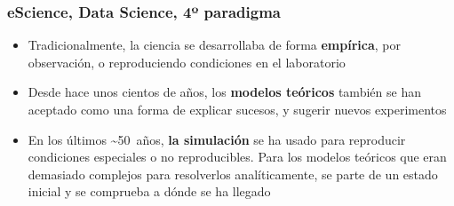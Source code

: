 \documentclass[14pt]{beamer}
\begin{document}

\begin{frame}
  \frametitle{eScience, Data Science, 4º paradigma}
  \begin{itemize}
  \item Tradicionalmente, la ciencia se desarrollaba de forma {\bf
      empírica}, por observación, o reproduciendo condiciones en el
    laboratorio
  \item Desde hace unos cientos de años, los {\bf modelos teóricos} también
    se han aceptado como una forma de explicar sucesos, y sugerir
    nuevos experimentos
  \item En los últimos \~{}50~años, {\bf la simulación} se ha usado para
    reproducir condiciones especiales o no reproducibles. Para los modelos
    teóricos que eran demasiado complejos para resolverlos analíticamente,
    se parte de un estado inicial y se comprueba a dónde se ha llegado
  \end{itemize}
\end{frame}
\end{document}

